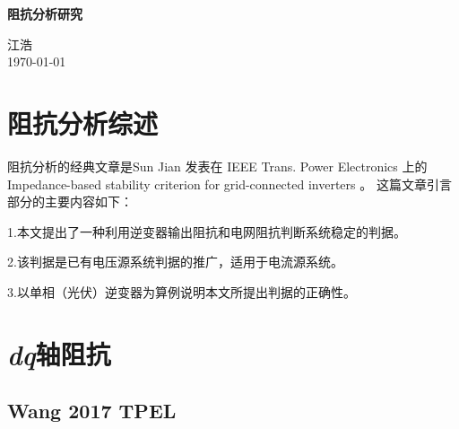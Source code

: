 \documentclass[12pt, a4paper, UTF8, fontset=adobe, scheme=chinese, heading=true, oneside]{ctexbook} %
\begin{document}
\frontmatter
\begin{titlepage}
\begin{center}

\vspace*{5cm}
{\huge \bfseries 阻抗分析研究}\\[0.4cm]

\vspace{12cm}

{\large 江浩} \\[1cm]
{\large \today}

\end{center}
\end{titlepage}

\begin{titlepage}
\begin{center}

\vspace*{8cm}

\end{center}
\end{titlepage}

{
\hypersetup{linkcolor=black} %
\tableofcontents %
}

\mainmatter %

\chapter{阻抗分析综述}

阻抗分析的经典文章是Sun Jian 发表在 IEEE Trans. Power Electronics 上的
Impedance-based stability criterion for grid-connected inverters \cite{sun2011}。
这篇文章引言部分的主要内容如下：

1.本文提出了一种利用逆变器输出阻抗和电网阻抗判断系统稳定的判据。

2.该判据是已有电压源系统判据的推广，适用于电流源系统。

3.以单相（光伏）逆变器为算例说明本文所提出判据的正确性。 

\chapter{\textit{dq}轴阻抗}

\section{Wang 2017 TPEL}
\end{document}
